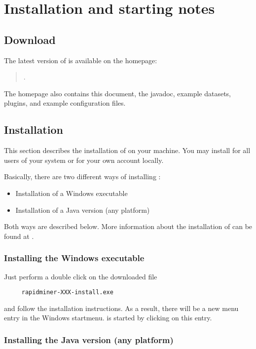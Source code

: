 \chapter{Installation and starting notes}

\section{Download}
The latest version of \rapidminer is available on the \rapidminer homepage:
\begin{quote}
  \rapidminerurl.
\end{quote}
%
The \rapidminer homepage also contains this document, the \rapidminer javadoc, example
datasets, plugins, and example configuration files.

\section{Installation}
\label{sec:installation}


This section describes the installation of \rapidminer on your machine. You may
install \rapidminer for all users of your system or for your own account 
locally.

Basically, there are two different ways of installing \rapidminer:
\begin{itemize}
\item Installation of a Windows executable
\item Installation of a Java version (any platform)
\end{itemize}

Both ways are described below. More information about the installation 
of \rapidminer can be found at \rapidminerurl.


\subsection{Installing the Windows executable}

Just perform a double click on the downloaded file 
\begin{verbatim}
     rapidminer-XXX-install.exe
\end{verbatim}
and follow the installation instructions. As a result, there will be
a new menu entry in the Windows startmenu. \rapidminer is started by clicking
on this entry.


\subsection{Installing the Java version (any platform)}

